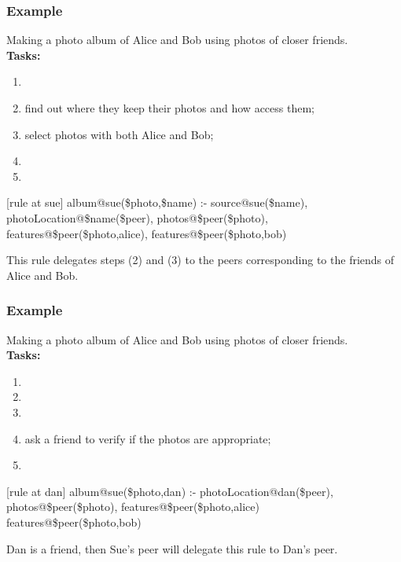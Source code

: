 \documentclass{beamer}
\begin{document}
\frame
{
	\frametitle{Example}
	
	Making a photo album of Alice and Bob using photos of closer friends. \\
	\textbf{Tasks:}
	\begin{enumerate}
		\item 
		\item find out where they keep their photos and how access them; 
		\item select photos with both Alice and Bob;
		\item 
		\item 
	\end{enumerate}

	\begin{block}{[rule at sue]}
		album@sue(\$photo,\$name) :- source@sue(\$name), \\
		\hspace{2.5cm} photoLocation@\$name(\$peer), photos@\$peer(\$photo), \\
		\hspace{2.5cm} features@\$peer(\$photo,alice), features@\$peer(\$photo,bob) \\
	\end{block}

	This rule delegates steps (2) and (3) to the peers corresponding to the friends of Alice and Bob.
	
}

\frame
{
	\frametitle{Example}
	
	Making a photo album of Alice and Bob using photos of closer friends. \\
	\textbf{Tasks:}
	\begin{enumerate}
		\item 
		\item  
		\item 
		\item ask a friend to verify if the photos are appropriate;
		\item 
	\end{enumerate}

	\begin{block}{[rule at dan]}
		album@sue(\$photo,dan) :- photoLocation@dan(\$peer), \\
		\hspace{2.5cm} photos@\$peer(\$photo), features@\$peer(\$photo,alice) \\
		\hspace{2.5cm} features@\$peer(\$photo,bob) \\
	\end{block}

	Dan is a friend, then Sue's peer will delegate this rule to Dan's peer.
	
}
\end{document}
